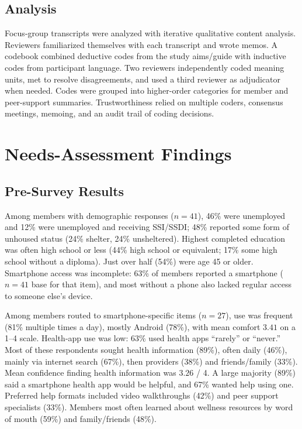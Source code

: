 \documentclass[conference,a4paper]{IEEEtran}
\begin{document}
\subsection{Analysis}
Focus-group transcripts were analyzed with iterative qualitative content
analysis. Reviewers familiarized themselves with each transcript and wrote
memos. A codebook combined deductive codes from the study aims/guide with
inductive codes from participant language. Two reviewers independently coded
meaning units, met to resolve disagreements, and used a third reviewer as
adjudicator when needed. Codes were grouped into higher-order categories for
member and peer-support summaries. Trustworthiness relied on multiple coders,
consensus meetings, memoing, and an audit trail of coding decisions.

\section{Needs-Assessment Findings}

\subsection{Pre-Survey Results}
Among members with demographic responses ($n{=}41$), 46\% were unemployed and
12\% were unemployed and receiving SSI/SSDI; 48\% reported some form of unhoused
status (24\% shelter, 24\% unsheltered). Highest completed education was often high school or less (44\% high school
or equivalent; 17\% some high school without a diploma). Just over half
(54\%) were age 45 or older. Smartphone access was incomplete: 63\% of members
reported a smartphone ($n{=}41$ base for that item), and most without a phone
also lacked regular access to someone else's device.

Among members routed to smartphone-specific items ($n{=}27$), use was frequent
(81\% multiple times a day), mostly Android (78\%), with mean comfort $3.41$ on
a 1--4 scale.
Health-app use was low: 63\% used health apps ``rarely'' or ``never.'' Most of
these respondents sought health information (89\%), often daily (46\%), mainly
via internet search (67\%), then providers (38\%) and friends/family (33\%).
Mean confidence finding health information was $3.26$ / 4. A large majority
(89\%) said a smartphone health app would be helpful, and 67\% wanted help using
one. Preferred help formats included video walkthroughs (42\%) and peer support
specialists (33\%). Members most often learned about wellness resources by word
of mouth (59\%) and family/friends (48\%).
\end{document}
